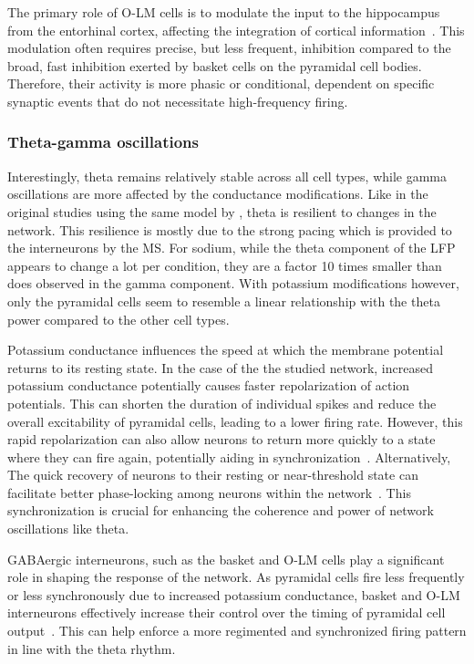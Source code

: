 The primary role of O-LM cells is to modulate the input to the hippocampus from the entorhinal cortex,
affecting the integration of cortical information~\parencite{leaoOLMInterneuronsDifferentially2012}. This modulation often requires precise,
but less frequent, inhibition compared to the broad, fast inhibition exerted by basket cells on the pyramidal cell bodies.
Therefore, their activity is more phasic or conditional, dependent on specific synaptic events that do not necessitate high-frequency firing.

\subsubsection{Theta-gamma oscillations}
Interestingly, theta remains relatively stable across all cell types, while gamma oscillations are more affected by the conductance modifications.
Like in the original studies using the same model by \textcite{sanjayImpairedDendriticInhibition2015,neymotinKetamineDisruptsTheta2011},
theta is resilient to changes in the network. This resilience is mostly due to the strong pacing which is provided to the interneurons by the MS\@.
For sodium, while the theta component of the LFP appears to change a lot per condition, they are a factor 10 times smaller than does observed in the gamma component.
With potassium modifications however, only the pyramidal cells seem to resemble a linear relationship with the theta power compared to the other cell types.

Potassium conductance influences the speed at which the membrane potential returns to its resting state.
In the case of the the studied network, increased potassium conductance potentially causes faster repolarization of action potentials.
This can shorten the duration of individual spikes and reduce the overall excitability of pyramidal cells, leading to a lower firing rate.
However, this rapid repolarization can also allow neurons to return more quickly to a state where they can fire again, potentially aiding in
synchronization~\parencite{mysinMechanismsFunctionsRole2022}.
Alternatively, The quick recovery of neurons to their resting or near-threshold state can facilitate better phase-locking among neurons within
the network~\parencite{leungPhasicModulationHippocampal2020a}. This synchronization is crucial for enhancing the coherence and power of network
oscillations like theta.

GABAergic interneurons, such as the basket and O-LM cells play a significant role in shaping the response of the network.
As pyramidal cells fire less frequently or less synchronously due to increased potassium conductance,
basket and O-LM interneurons effectively increase their control over the timing of pyramidal cell output~\parencite{unalSpatiotemporalSpecializationGABAergic2018}.
This can help enforce a more regimented and synchronized firing pattern in line with the theta rhythm.

